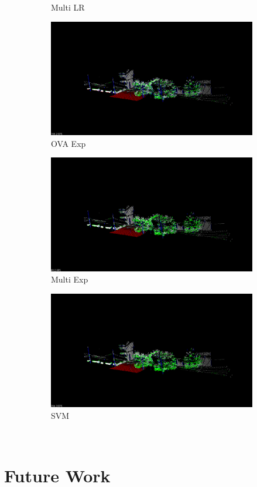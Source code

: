 \documentclass[a4paper]{article}
\begin{document}
\begin{figure}[!htp]
\begin{subfigure}[b]{.3\linewidth}
        \caption{Multi LR}
    \includegraphics[width=\textwidth]{exp_test.png}
        \caption{OVA Exp}
  \end{subfigure} \quad
  \begin{subfigure}[b]{.3\linewidth}
    \includegraphics[width=\textwidth]{multiexp_test.png}
        \caption{Multi Exp}
  \end{subfigure}\quad
  \begin{subfigure}[b]{.3\linewidth}
    \includegraphics[width=\textwidth]{svm_test.png}
        \caption{SVM}

  \end{subfigure}\\
  \caption{\label{fig:viz_test} 
  }
\end{figure}


\section{Future Work}

\begin{thebibliography}{10}
\end{thebibliography}
\end{document}
